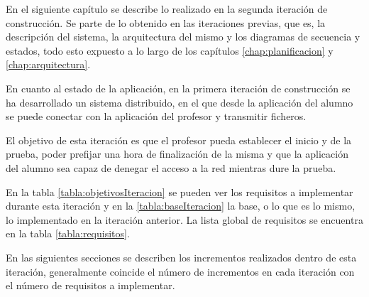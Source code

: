 
\label{chap:iteracion}

\chaptertoc

En el siguiente capítulo se describe lo realizado en la segunda iteración de construcción.
Se parte de lo obtenido en las iteraciones previas, que es, la descripción del sistema, la arquitectura del mismo y los diagramas de secuencia y estados, todo esto expuesto a lo largo de los capítulos \ref{chap:planificacion} y \ref{chap:arquitectura}.
\newline

En cuanto al estado de la aplicación, en la primera iteración de construcción se ha desarrollado un sistema distribuido, en el que desde la aplicación del alumno se puede conectar con la aplicación del profesor y transmitir ficheros.
\newline

El objetivo de esta iteración es que el profesor pueda establecer el inicio y de la prueba, poder prefijar una hora de finalización de la misma y que la aplicación del alumno sea capaz de denegar el acceso a la red mientras dure la prueba.
\newline

En la tabla \ref{tabla:objetivosIteracion} se pueden ver los requisitos a implementar durante esta iteración y en la \ref{tabla:baseIteracion} la base, o lo que es lo mismo, lo implementado en la iteración anterior. La lista global de requisitos se encuentra en la tabla \ref{tabla:requisitos}.
\newline

En las siguientes secciones se describen los incrementos realizados dentro de esta iteración, generalmente coincide el número de incrementos en cada iteración con el número de requisitos a implementar.


